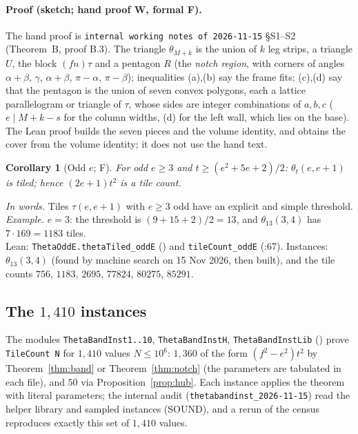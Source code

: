 \documentclass[11pt,reqno]{amsart}
\theoremstyle{plain}
\newtheorem{corollary}[theorem]{Corollary}
\theoremstyle{definition}
\newcommand{\sF}{\textup{\textsf{F}}}
\newcommand{\sW}{\textup{\textsf{W}}}
\newcommand{\rec}[1]{\textup{\texttt{#1}}}
\begin{document}
\paragraph{Proof (sketch; hand proof \sW, formal \sF).} The hand proof is \rec{internal working notes of 2026-11-15}
\S S1--S2 (Theorem~B, proof B.3). The triangle $\theta_{M+k}$ is the union of $k$ leg strips, a triangle $U$, the
block $(fn)\tau$ and a pentagon $R$ (the \emph{notch region}, with corners of angles $\alpha+\beta$, $\gamma$,
$\alpha+\beta$, $\pi-\alpha$, $\pi-\beta$); inequalities (a),(b) say the frame fits; (c),(d) say that the
pentagon is the union of seven convex polygons, each a lattice parallelogram or triangle of $\tau$, whose
sides are integer combinations of $a,b,c$ ($e\mid M+k-s$ for the column widths, (d) for the left wall, which lies on the
base). The Lean proof builds the seven pieces and the volume identity, and obtains the cover from the volume
identity; it does not use the hand text.

\begin{corollary}[Odd $e$; \sF]\label{cor:odde}
For odd $e\ge3$ and $t\ge(e^2+5e+2)/2$: $\theta_t(e,e+1)$ is tiled; hence $(2e+1)t^2$ is a tile count.
\end{corollary}
\noindent\emph{In words.} Tiles $\tau(e,e+1)$ with $e\ge3$ odd have an explicit and simple threshold. \emph{Example.} $e=3$: the
threshold is $(9+15+2)/2=13$, and $\theta_{13}(3,4)$ has $7\cdot169=1183$ tiles.\\
\noindent Lean: \texttt{ThetaOddE.thetaTiled\_oddE} () and \texttt{tileCount\_oddE} (:67). Instances:
$\theta_{13}(3,4)$ (found by machine search on 15 Nov 2026, then built), and the tile counts $756$, $1183$, $2695$,
$77824$, $80275$, $85291$.

\subsection{The $1{,}410$ instances}\label{sub:band:inst}
The modules \texttt{ThetaBandInst1..10}, \texttt{ThetaBandInstH}, \texttt{ThetaBandInstLib}
() prove \texttt{TileCount N} for $1{,}410$ values $N\le10^6$: $1{,}360$ of the form
$(f^2-e^2)t^2$ by Theorem~\ref{thm:band} or Theorem~\ref{thm:notch} (the parameters are tabulated in each file), and $50$
via Proposition~\ref{prop:hub}. Each instance applies the theorem with literal parameters; the internal audit
(\rec{thetabandinst\_2026-11-15}) read the helper library and sampled instances (SOUND), and a rerun of the census
reproduces exactly this set of $1{,}410$ values.
\end{document}
